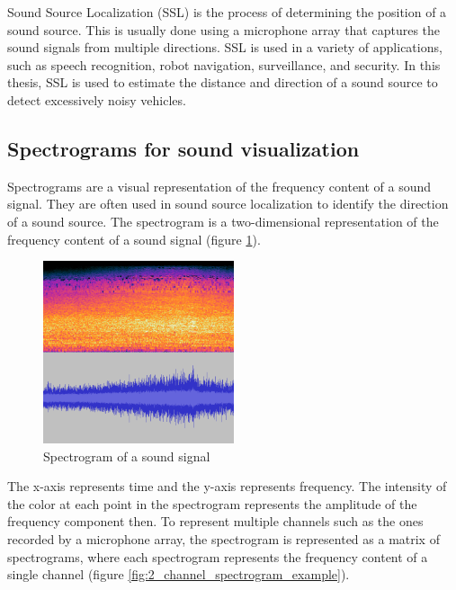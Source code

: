 Sound Source Localization (SSL) is the process of determining the position of a sound source. This is usually done using a microphone array that captures the sound signals from multiple directions. SSL is used in a variety of applications, such as speech recognition, robot navigation, surveillance, and security. In this thesis, SSL is used to estimate the distance and direction of a sound source to detect excessively noisy vehicles.

\subsection{Spectrograms for sound visualization}

Spectrograms are a visual representation of the frequency content of a sound signal. They are often used in sound source localization to identify the direction of a sound source. The spectrogram is a two-dimensional representation of the frequency content of a sound signal (figure \ref*{fig:spectrogram_example}).

\begin{figure}[H]
    \centering
    \includegraphics[width=0.5\textwidth]{../Images/spectrogram-example.png}
    \caption{Spectrogram of a sound signal}
    \label{fig:spectrogram_example}
\end{figure}

The x-axis represents time and the y-axis represents frequency. The intensity of the color at each point in the spectrogram represents the amplitude of the frequency component then. To represent multiple channels such as the ones recorded by a microphone array, the spectrogram is represented as a matrix of spectrograms, where each spectrogram represents the frequency content of a single channel (figure \ref*{fig:2_channel_spectrogram_example}).


